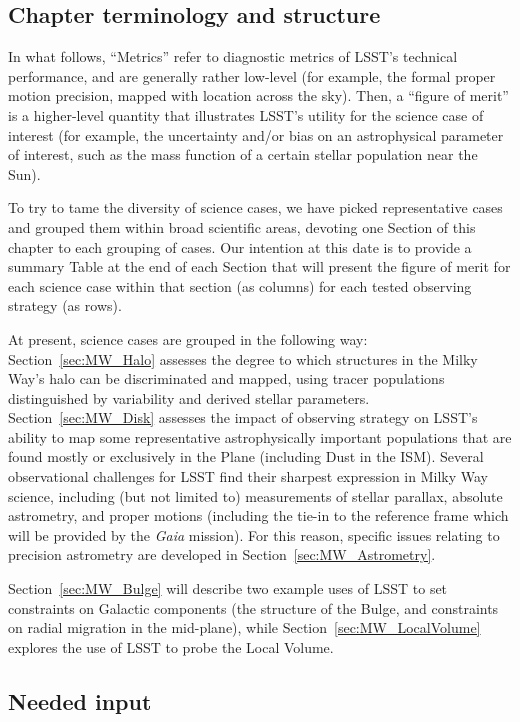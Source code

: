 \subsection{Chapter terminology and structure}

In what follows, ``Metrics'' refer to diagnostic metrics of LSST's
technical performance, and are generally rather low-level (for
example, the formal proper motion precision, mapped with location
across the sky). Then, a ``figure of merit'' is a higher-level
quantity that illustrates LSST's utility for the science case of
interest (for example, the uncertainty and/or bias on an astrophysical
parameter of interest, such as the mass function of a certain stellar
population near the Sun).

To try to tame the diversity of science cases, we have picked
representative cases and grouped them within broad scientific areas,
devoting one Section of this chapter to each grouping of cases. Our
intention at this date is to provide a summary Table at the end of
each Section that will present the figure of merit for each science
case within that section (as columns) for each tested observing
strategy (as rows).

At present, science cases are grouped in the following way:
Section~\ref{sec:MW_Halo} assesses the degree to which structures in the Milky
Way's halo can be discriminated and mapped, using tracer populations
distinguished by variability and derived stellar parameters.
Section~\ref{sec:MW_Disk} assesses the impact of observing strategy on LSST's
ability to map some representative astrophysically important
populations that are found mostly or exclusively in the Plane
(including Dust in the ISM). Several observational challenges for LSST
find their sharpest expression in Milky Way science, including (but
not limited to) measurements of stellar parallax, absolute astrometry,
and proper motions (including the tie-in to the reference frame which
will be provided by the \textit{Gaia} mission). For this reason, specific
issues relating to precision astrometry are developed in
Section~\ref{sec:MW_Astrometry}.

Section~\ref{sec:MW_Bulge} will describe two example uses of LSST to
set constraints on Galactic components (the structure of the Bulge,
and constraints on radial migration in the mid-plane), while
Section~\ref{sec:MW_LocalVolume} explores the use of LSST to probe the Local
Volume.

\subsection{Needed input}

